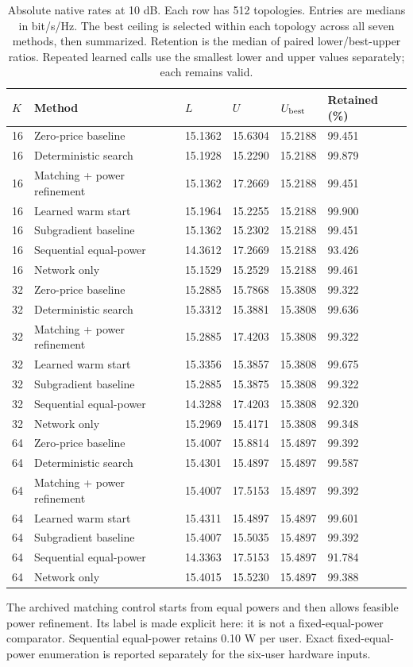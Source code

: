 \documentclass[10pt,letterpaper]{article}
\begin{document}
\begin{table}[htbp]\centering\small
\setlength{\tabcolsep}{4pt}
\caption{Absolute native rates at 10 dB. Each row has 512 topologies. Entries are medians in bit/s/Hz. The best ceiling is selected within each topology across all seven methods, then summarized. Retention is the median of paired lower/best-upper ratios. Repeated learned calls use the smallest lower and upper values separately; each remains valid.}\label{supp:rates}
\begin{tabular}{llllll}\toprule
$K$ & Method & $L$ & $U$ & $U_{\rm best}$ & Retained (\%)\\
\midrule
16 & Zero-price baseline & 15.1362 & 15.6304 & 15.2188 & 99.451\\
16 & Deterministic search & 15.1928 & 15.2290 & 15.2188 & 99.879\\
16 & Matching + power refinement & 15.1362 & 17.2669 & 15.2188 & 99.451\\
16 & Learned warm start & 15.1964 & 15.2255 & 15.2188 & 99.900\\
16 & Subgradient baseline & 15.1362 & 15.2302 & 15.2188 & 99.451\\
16 & Sequential equal-power & 14.3612 & 17.2669 & 15.2188 & 93.426\\
16 & Network only & 15.1529 & 15.2529 & 15.2188 & 99.461\\
32 & Zero-price baseline & 15.2885 & 15.7868 & 15.3808 & 99.322\\
32 & Deterministic search & 15.3312 & 15.3881 & 15.3808 & 99.636\\
32 & Matching + power refinement & 15.2885 & 17.4203 & 15.3808 & 99.322\\
32 & Learned warm start & 15.3356 & 15.3857 & 15.3808 & 99.675\\
32 & Subgradient baseline & 15.2885 & 15.3875 & 15.3808 & 99.322\\
32 & Sequential equal-power & 14.3288 & 17.4203 & 15.3808 & 92.320\\
32 & Network only & 15.2969 & 15.4171 & 15.3808 & 99.348\\
64 & Zero-price baseline & 15.4007 & 15.8814 & 15.4897 & 99.392\\
64 & Deterministic search & 15.4301 & 15.4897 & 15.4897 & 99.587\\
64 & Matching + power refinement & 15.4007 & 17.5153 & 15.4897 & 99.392\\
64 & Learned warm start & 15.4311 & 15.4897 & 15.4897 & 99.601\\
64 & Subgradient baseline & 15.4007 & 15.5035 & 15.4897 & 99.392\\
64 & Sequential equal-power & 14.3363 & 17.5153 & 15.4897 & 91.784\\
64 & Network only & 15.4015 & 15.5230 & 15.4897 & 99.388\\
\bottomrule\end{tabular}
\end{table}
The archived matching control starts from equal powers and then allows feasible power refinement. Its label is made explicit here: it is not a fixed-equal-power comparator. Sequential equal-power retains 0.10 W per user. Exact fixed-equal-power enumeration is reported separately for the six-user hardware inputs.
\end{document}
